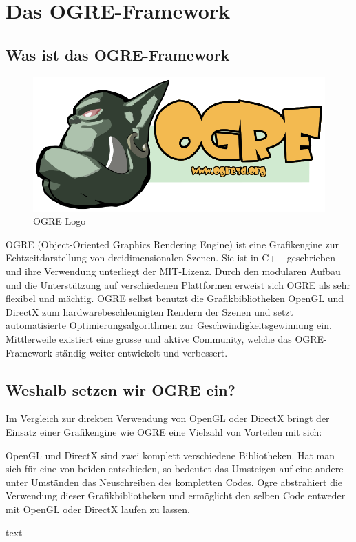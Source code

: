 \section{Das OGRE-Framework}

\subsection{Was ist das OGRE-Framework}

\begin{figure}
	\includegraphics[width=\linewidth]{src/OgreLogo.png}
	\caption{OGRE Logo} %
	\label{OGRE Logo} %
\end{figure}

OGRE (Object-Oriented Graphics Rendering Engine) ist eine Grafikengine zur Echtzeitdarstellung von dreidimensionalen Szenen. Sie ist in C++ geschrieben und ihre Verwendung unterliegt der MIT-Lizenz. Durch den modularen Aufbau und die Unterstützung auf verschiedenen Plattformen erweist sich OGRE als sehr flexibel und mächtig. OGRE selbst benutzt die Grafikbibliotheken OpenGL und DirectX zum hardwarebeschleunigten Rendern der Szenen und setzt automatisierte Optimierungsalgorithmen zur Geschwindigkeitsgewinnung ein. Mittlerweile existiert eine grosse und aktive Community, welche das OGRE-Framework ständig weiter entwickelt und verbessert.

\subsection{Weshalb setzen wir OGRE ein?}

Im Vergleich zur direkten Verwendung von OpenGL oder DirectX bringt der Einsatz einer Grafikengine wie OGRE eine Vielzahl von Vorteilen mit sich:

 OpenGL und DirectX sind zwei komplett verschiedene Bibliotheken. Hat man sich für eine von beiden entschieden, so bedeutet das Umsteigen auf eine andere unter Umständen das Neuschreiben des kompletten Codes. Ogre abstrahiert die Verwendung dieser Grafikbibliotheken und ermöglicht den selben Code entweder mit OpenGL oder DirectX laufen zu lassen.

 text
